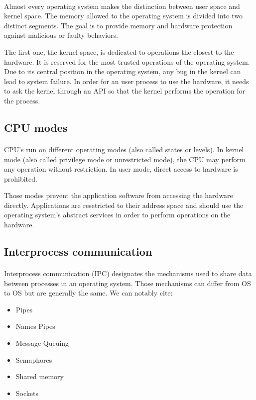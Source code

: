 \paragraph{}
Almost every operating system makes the distinction between user space and kernel space.
The memory allowed to the operating system is divided into two distinct segments.
The goal is to provide memory and hardware protection against malicious or faulty behaviors.

The first one, the kernel space, is dedicated to operations the closest to the hardware.
It is reserved for the most trusted operations of the operating system.
Due to its central position in the operating system, any bug in the kernel can lead to system failure.
In order for an user process to use the hardware, it needs to ask the kernel through an API so that the kernel performs the operation for the process.

\subsection{CPU modes}
\paragraph{}
CPU's run on different operating modes (also called states or levels).
In kernel mode (also called privilege mode or unrestricted mode), the CPU may perform any operation without restriction.
In user mode, direct access to hardware is prohibited.

Those modes prevent the application software from accessing the hardware directly.
Applications are resetricted to their address space 
    and should use the operating system's abstract services in order to perform operations on the hardware.

\subsection{Interprocess communication}
\paragraph{}
Interprocess communication (IPC) designates the mechanisms used to share data between processes in an operating system.
Those mechanisms can differ from OS to OS but are generally the same.
We can notably cite:
\begin{itemize}
    \item Pipes
    \item Names Pipes
    \item Message Queuing
    \item Semaphores
    \item Shared memory
    \item Sockets
\end{itemize}


